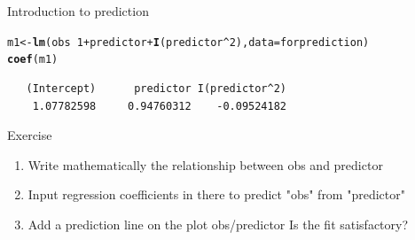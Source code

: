 \documentclass[10pt]{beamer}\usepackage[]{graphicx}\usepackage[]{color}
\makeatletter
\newcommand{\hlnum}[1]{\textcolor[rgb]{0.686,0.059,0.569}{#1}}%
\newcommand{\hlopt}[1]{\textcolor[rgb]{0,0,0}{#1}}%
\newcommand{\hlstd}[1]{\textcolor[rgb]{0.345,0.345,0.345}{#1}}%
\newcommand{\hlkwb}[1]{\textcolor[rgb]{0.69,0.353,0.396}{#1}}%
\newcommand{\hlkwc}[1]{\textcolor[rgb]{0.333,0.667,0.333}{#1}}%
\newcommand{\hlkwd}[1]{\textcolor[rgb]{0.737,0.353,0.396}{\textbf{#1}}}%
\newenvironment{kframe}{%
 \def\at@end@of@kframe{}%
 \ifinner\ifhmode%
  \def\at@end@of@kframe{\end{minipage}}%
  \begin{minipage}{\columnwidth}%
 \fi\fi%
 \def\FrameCommand##1{\hskip\@totalleftmargin \hskip-\fboxsep
 \colorbox{shadecolor}{##1}\hskip-\fboxsep
     \hskip-\linewidth \hskip-\@totalleftmargin \hskip\columnwidth}%
 \MakeFramed {\advance\hsize-\width
   \@totalleftmargin\z@ \linewidth\hsize
   \@setminipage}}%
 {\par\unskip\endMakeFramed%
 \at@end@of@kframe}
\newenvironment{knitrout}{}{} %
\makeatother
\begin{document}
\begin{frame}[fragile]{Introduction to prediction}

\begin{knitrout}\small
{}\color{fgcolor}\begin{kframe}
\begin{alltt}
\hlstd{m1} \hlkwb{<-} \hlkwd{lm}\hlstd{(obs} \hlopt{~} \hlnum{1} \hlopt{+} \hlstd{predictor} \hlopt{+} \hlkwd{I}\hlstd{(predictor}\hlopt{^}\hlnum{2}\hlstd{),} \hlkwc{data}\hlstd{=forprediction)}
\hlkwd{coef}\hlstd{(m1)}
\end{alltt}
\begin{verbatim}
   (Intercept)      predictor I(predictor^2) 
    1.07782598     0.94760312    -0.09524182 
\end{verbatim}
\end{kframe}
\end{knitrout}
  
  \begin{alertblock}{Exercise}
    \begin{enumerate}
      \item Write mathematically the relationship between obs and predictor
      \item Input regression coefficients in there to predict "obs" from "predictor"
      \item Add a prediction line on the plot obs/predictor
    Is the fit satisfactory?
    \end{enumerate}
  \end{alertblock}
\end{frame}
\end{document}
